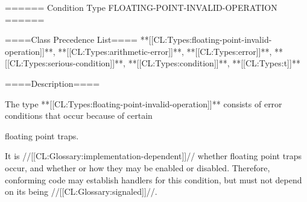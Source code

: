 ====== Condition Type FLOATING-POINT-INVALID-OPERATION ======

====Class Precedence List==== **[[CL:Types:floating-point-invalid-operation]]**, **[[CL:Types:arithmetic-error]]**, **[[CL:Types:error]]**, **[[CL:Types:serious-condition]]**, **[[CL:Types:condition]]**, **[[CL:Types:t]]**

====Description====

The type **[[CL:Types:floating-point-invalid-operation]]** consists of error conditions that occur because of certain

floating point traps.

It is //[[CL:Glossary:implementation-dependent]]// whether floating point traps occur, and whether or how they may be enabled or disabled. Therefore, conforming code may establish handlers for this condition, but must not depend on its being //[[CL:Glossary:signaled]]//.

